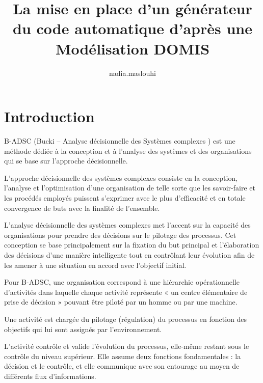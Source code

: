 \documentclass[a4paper,12pt]{article}
\title{La mise en place d'un générateur du code automatique d’après une Modélisation DOMIS}
\author{nadia.maslouhi }
\begin{document}
\maketitle

\vspace{1cm}

\section{Introduction}

\vspace{1cm}
B-ADSC (Bucki – Analyse décisionnelle des Systèmes complexes )  est une méthode dédiée à la conception et à l’analyse des systèmes et des organisations qui se base sur l’approche décisionnelle.

L'approche décisionnelle des systèmes complexes consiste en la conception, l'analyse et l'optimisation d'une organisation de telle sorte que les savoir-faire et les procédés employés puissent s’exprimer avec le plus d'efficacité et en totale convergence de buts avec la finalité de l'ensemble.

\vspace{0,5cm}

L'analyse décisionnelle des systèmes complexes met l'accent sur la capacité des organisations pour prendre des décisions sur le pilotage des processus. 
Cet conception se base principalement sur la fixation du but principal et l’élaboration des décisions d’une manière intelligente tout en contrôlant leur évolution afin de les amener à une situation en accord avec l’objectif initial.

\vspace{0,5cm}

Pour B-ADSC, une organisation correspond à une hiérarchie opérationnelle d’activités dans laquelle chaque activité représente « un centre élémentaire de prise de décision » pouvant être piloté par un homme ou par une machine.

Une activité est chargée du pilotage (régulation) du processus en fonction des objectifs qui lui sont assignés par l'environnement.

L'activité contrôle et valide l'évolution du processus, elle-même restant sous le contrôle du niveau supérieur.  Elle assume deux fonctions fondamentales : la décision et le contrôle, et elle communique avec son entourage au moyen de différents flux d’informations.

\vspace{0,5cm}
\end{document}
